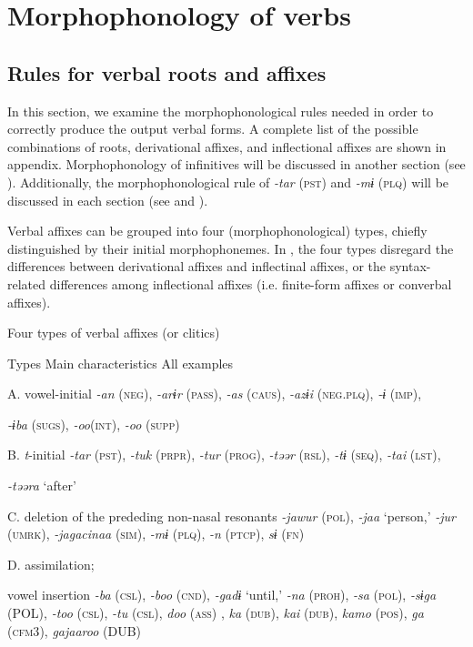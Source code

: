 \section{Morphophonology of verbs}
\label{bkm:Ref356245430}\subsection{Rules for verbal roots and affixes}

In this section, we examine the morphophonological rules needed in order to correctly produce the output verbal forms. A complete list of the possible combinations of roots, derivational affixes, and inflectional affixes are shown in appendix. Morphophonology of infinitives will be discussed in another section (see ). Additionally, the morphophonological rule of \textit{-tar} (\textsc{pst}) and \textit{-mɨ} (\textsc{plq}) will be discussed in each section (see  and ).

  Verbal affixes can be grouped into four (morphophonological) types, chiefly distinguished by their initial morphophonemes. In , the four types disregard the differences between derivational affixes and inflectinal affixes, or the syntax-related differences among inflectional affixes (i.e. finite-form affixes or converbal affixes).

\begin{table}
\caption{\label{tab:key:56}Four types of verbal affixes (or clitics)}

Types  Main characteristics  All examples

A.  vowel-initial  \textit{-an} (\textsc{neg}), \textit{-arɨr} (\textsc{pass}), \textit{-as} (\textsc{caus}), \textit{-azɨi} (\textsc{neg}.\textsc{plq}), \textit{-ɨ} (\textsc{imp}),

\textit{-ɨba} (\textsc{sugs}), \textit{-oo}(\textsc{int}), \textit{-oo} (\textsc{supp})

B.  \textit{t}-initial  \textit{-tar} (\textsc{pst}), \textit{-tuk} (\textsc{prpr}), \textit{-tur} (\textsc{prog}), \textit{-təər} (\textsc{rsl}), \textit{-tɨ} (\textsc{seq}), \textit{-tai} (\textsc{lst}),

\textit{-təəra} ‘after’

C.  deletion of the prededing non-nasal resonants  \textit{-jawur} (\textsc{pol}), \textit{-jaa} ‘person,’ \textit{-jur} (\textsc{umrk}), \textit{-jagacinaa} (\textsc{sim}), \textit{-mɨ} (\textsc{plq}), \textit{-n} (\textsc{ptcp}), \textit{sɨ} (\textsc{fn})

D.  assimilation;

vowel insertion  \textit{-ba} (\textsc{csl}), \textit{-boo} (\textsc{cnd}), \textit{-gadɨ} ‘until,’ \textit{-na} (\textsc{proh}), \textit{-sa} (\textsc{pol}), \textit{-sɨga} (POL), \textit{-too} (\textsc{csl}), \textit{-tu} (\textsc{csl}), \textit{doo} (\textsc{ass}) , \textit{ka} (\textsc{dub}), \textit{kai} (\textsc{dub}), \textit{kamo} (\textsc{pos}), \textit{ga} (\textsc{cfm3}), \textit{gajaaroo} (DUB)
\end{table}

